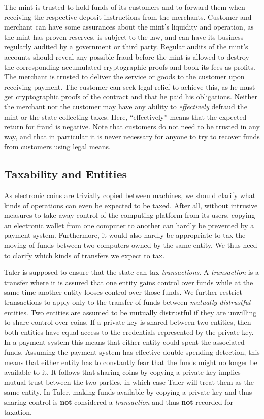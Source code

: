 \documentclass{llncs}
\begin{document}
The mint is trusted to hold funds of its customers and to forward them
when receiving the respective deposit instructions from the merchants.
Customer and merchant can have some assurances about the mint's
liquidity and operation, as the mint has proven reserves, is subject
to the law, and can have its business regularly audited
 by a government or third party.
Regular audits of the mint's accounts should reveal any possible fraud
before the mint is allowed to destroy the corresponding accumulated
cryptographic proofs and book its fees as profits.
%
The merchant is trusted to deliver the service or goods to the
customer upon receiving payment.  The customer can seek legal relief
to achieve this, as he must get cryptographic proofs of the contract
and that he paid his obligations.
%
Neither the merchant nor the customer may have any ability to {\em
  effectively} defraud the mint or the state collecting taxes.  Here,
``effectively'' means that the expected return for fraud is negative.
Note that customers do not need to be trusted in any way, and that in
particular it is never necessary for anyone to try to recover funds
from customers using legal means.


\subsection{Taxability and Entities}

As electronic coins are trivially copied between machines, we should
clarify what kinds of operations can even be expected to be taxed.
After all, without intrusive measures to take away control of the
computing platform from its users, copying an electronic wallet from
one computer to another can hardly be prevented by a payment system.
Furthermore, it would also hardly be appropriate to tax the moving of
funds between two computers owned by the same entity.  We thus
need to clarify which kinds of transfers we expect to tax.

Taler is supposed to ensure that the state can tax {\em transactions}.
A {\em transaction} is a transfer where it is assured that one entity
gains control over funds while at the same time another entity looses
control over those funds.  We further restrict transactions to apply
only to the transfer of funds between {\em mutually distrustful}
entities.  Two entities are assumed to be mutually distrustful if they
are unwilling to share control over coins.  If a private key is shared
between two entities, then both entities have equal access to the
credentials represented by the private key.  In a payment system this
means that either entity could spent the associated funds.  Assuming
the payment system has effective double-spending detection, this means
that either entity has to constantly fear that the funds might no
longer be available to it.  It follows that sharing coins by copying
a private key implies mutual trust between the two parties, in which
case Taler will treat them as the same entity.
In Taler, making funds available by copying a private key and thus
sharing control is {\bf not} considered a {\em transaction} and
thus {\bf not} recorded for taxation.
\end{document}
